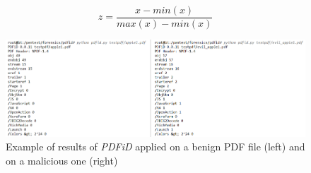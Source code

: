 
\begin{equation}
	\label{eq:1}
	z = \frac{x - min(x)}{max(x) - min(x)}
\end{equation}

\begin{figure}[H]
	\centerline{\includegraphics[scale=0.6]{figures/pdfidoutput.png}}  
	\caption{Example of results of \textit{PDFiD} applied on a benign PDF file (left) and on a malicious one (right)}
	\label{pdfidoutput}
\end{figure}

